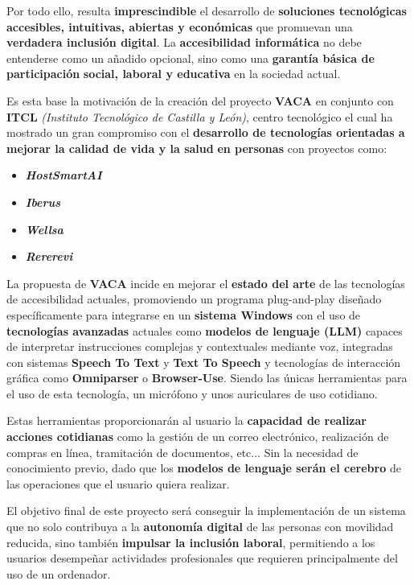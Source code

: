 Por todo ello, resulta \textbf{imprescindible} el desarrollo de \textbf{soluciones tecnológicas accesibles, intuitivas, abiertas y económicas} que promuevan una \textbf{verdadera inclusión digital}. La \textbf{accesibilidad informática} no debe entenderse como un añadido opcional, sino como una \textbf{garantía básica de participación} \textbf{social, laboral y educativa} en la sociedad actual.


Es esta base la motivación de la creación del proyecto \textbf{VACA} en conjunto con \textbf{ITCL} \textit{(Instituto Tecnológico de Castilla y León)}, centro tecnológico el cual ha mostrado un gran compromiso con el \textbf{desarrollo de tecnologías orientadas a mejorar la calidad de vida y la salud} \textbf{en personas} con proyectos como:

\begin{itemize}
\item \textit{\textbf{HostSmartAI}} \cite{itclHosmartAISoluciones}
\item \textit{\textbf{Iberus}} \cite{itclIBERUSIngeniera,itclIBERUS+WELLSA}
\item \textit{\textbf{Wellsa}}\cite{itclWELLSA,itclIBERUS+WELLSA}
\item \textit{\textbf{Rererevi}}\cite{itclREREREVI}
\end{itemize}

La propuesta de \textbf{VACA} incide en mejorar el \textbf{estado del arte} de las tecnologías de accesibilidad actuales, promoviendo un programa plug-and-play diseñado específicamente para integrarse en un \textbf{sistema Windows} con el uso de \textbf{tecnologías avanzadas} actuales como \textbf{modelos de lenguaje (LLM)} capaces de interpretar instrucciones complejas y contextuales mediante voz, integradas con sistemas \textbf{Speech To Text} y \textbf{Text To Speech} y tecnologías de interacción gráfica como \textbf{Omniparser} o \textbf{Browser-Use}. Siendo las únicas herramientas para el uso de esta tecnología, un micrófono y unos auriculares de uso cotidiano.

Estas herramientas proporcionarán al usuario la \textbf{capacidad de realizar acciones cotidianas} como la gestión de un correo electrónico, realización de compras en línea, tramitación de documentos, etc... Sin la necesidad de conocimiento previo, dado que los \textbf{modelos de lenguaje serán el cerebro} de las operaciones que el usuario quiera realizar.

El objetivo final de este proyecto será conseguir la implementación de un sistema que no solo contribuya a la \textbf{autonomía digital} de las personas con movilidad reducida, sino también \textbf{impulsar la inclusión laboral}, permitiendo a los usuarios desempeñar actividades profesionales que requieren principalmente del uso de un ordenador.

